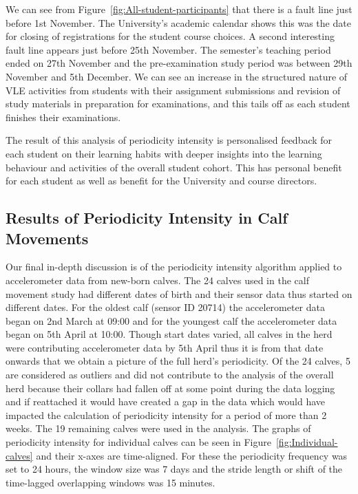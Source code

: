 \documentclass[preprints,article,accept,pdftex,moreauthors]{Definitions/mdpi}
\begin{document}
{We can see from Figure~\ref{fig:All-student-participants} that there is a fault line just before 1st November. The University's academic calendar shows this was the date for  closing of registrations for the student course choices.  A second interesting fault line appears just before 25th November. The semester's teaching period  ended on 27th November and the pre-examination study period  was between 29th November and 5th December. We can see  an increase in the structured nature of VLE activities  from  students with their assignment submissions and {revision} of study materials in preparation for examinations, and this tails off as each student finishes their examinations.

The result of this analysis of periodicity intensity is personalised feedback for each student on their learning habits with deeper insights into the learning behaviour and activities of the overall student cohort. This has personal benefit for each student as well as benefit for the University and course directors.


\subsection{Results of Periodicity Intensity in Calf Movements}

{Our final in-depth discussion is of the periodicity intensity algorithm applied to accelerometer data from new-born calves.}
The 24 calves used in the calf movement study had different dates of birth and {their} sensor data thus started  on different dates. For the oldest calf (sensor ID 20714)  the accelerometer data began on 2nd March at 09:00 and for the youngest calf the accelerometer data began on  5th April at 10:00. Though  start dates varied, all  calves in the herd were contributing accelerometer data by 5th April thus {it is} from that date onwards that we  obtain a  picture of the full herd’s periodicity.  Of the 24 calves, 5 are considered as outliers and  did not contribute to the analysis of the overall herd because their collars had fallen off at some point during the data logging  and if reattached it would have created a gap in the data which would have impacted the calculation of periodicity intensity for a period of more than 2 weeks. The 19 remaining calves were used in the analysis. The graphs of periodicity intensity for individual calves can be seen in Figure~\ref{fig:Individual-calves} and {their x-axes} are time-aligned.  For these the periodicity frequency was set to 24 hours, the window size was 7 days and the stride {length} or shift of the time-lagged overlapping windows was 15 minutes.

}
\end{document}

